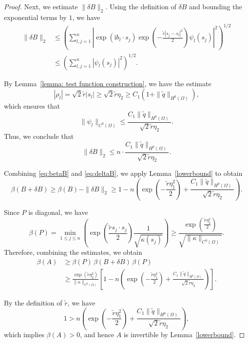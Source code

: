 \documentclass[10pt,a4paper]{amsart}
\begin{document}
\begin{proof}
Next, we estimate $\|\delta B\|_2$. Using the definition of $\delta B$ and bounding the exponential terms by $1$, we have
\begin{align*}
    \|\delta B\|_2 
    &\leq \left( \sum_{l,j=1}^n 
        \left| \exp(\mathrm{i} b_l \cdot s_j) 
        \exp\left(-\frac{\tilde{r} |s_j - s_l|^2}{2} \right) \psi_l(s_j) \right|^2 \right)^{1/2} \\
    &\leq \left( \sum_{l,j=1}^n 
        |\psi_l(s_j)|^2 \right)^{1/2}.
\end{align*}

By Lemma~\ref{lemma: test function construction}, we have the estimate
\[
|\rho_l| = \sqrt{2} \tilde{r} |s_l| \geq \sqrt{2} \tilde{r} \eta_2 
    \geq C_1\left(1 + \|\tilde{q}\|_{H^p(\Omega)} \right),
\]
which ensures that
\[
\|\psi_l\|_{C^0(\Omega)} \leq \frac{C_1 \|\tilde{q}\|_{H^p(\Omega)}}{\sqrt{2} \tilde{r} \eta_2}.
\]
Thus, we conclude that
\begin{equation}\label{eq:deltaB}
    \|\delta B\|_2 \leq n \cdot \frac{C_1 \|\tilde{q}\|_{H^p(\Omega)}}{\sqrt{2} \tilde{r} \eta_2}.
\end{equation}

Combining \eqref{eq:betaB} and \eqref{eq:deltaB}, we apply Lemma~\ref{lowerbound} to obtain
\begin{equation*}
    \beta(B + \delta B) \geq \beta(B) - \|\delta B\|_2 
    \geq 1 - n\left( \exp\left(-\frac{\tilde{r} \eta_1^2}{2} \right) + \frac{C_1 \|\tilde{q}\|_{H^p(\Omega)}}{\sqrt{2} \tilde{r} \eta_2} \right).
\end{equation*}

Since $P$ is diagonal, we have
\[
\beta(P) = \min_{1 \leq j \leq n} 
\left( \exp\left(\frac{\tilde{r} s_j \cdot s_j}{2} \right) 
\frac{1}{\sqrt{\kappa(s_j)}} \right)
\geq \frac{\exp\left(\frac{\tilde{r} \eta_2^2}{2} \right)}{\sqrt{ \|\kappa\|_{C^0(\Omega)} }}.
\]
Therefore, combining the estimates, we obtain
\begin{align*}
    \beta(A) 
    &\geq \beta(P)\, \beta(B + \delta B)\, \beta(P) \\
    &\geq \frac{\exp(\tilde{r} \eta_2^2)}{\|\kappa\|_{C^0(\Omega)}} 
    \left[ 1 - n \left( \exp\left(-\frac{\tilde{r} \eta_1^2}{2} \right) + \frac{C_1 \|\tilde{q}\|_{H^p(\Omega)}}{\sqrt{2} \tilde{r} \eta_2} \right) \right].
\end{align*}

By the definition of $\tilde{r}$, we have
\[
1 > n \left( \exp\left(-\frac{\tilde{r} \eta_1^2}{2} \right) + \frac{C_1 \|\tilde{q}\|_{H^p(\Omega)}}{\sqrt{2} \tilde{r} \eta_2} \right),
\]
which implies $\beta(A) > 0$, and hence $A$ is invertible by Lemma~\ref{lowerbound}.


\end{proof}
\end{document}
